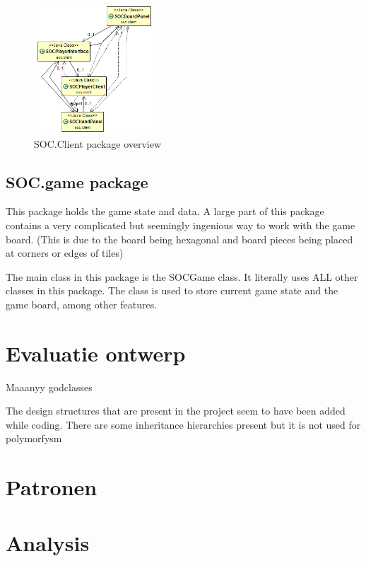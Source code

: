 \documentclass[pdftex12pt, a4paper]{article}
\begin{document}
\begin{figure}
\begin{center}
\includegraphics[width=0.4\textwidth]{Image/Ontwerp/ClientCore.png}
\caption{SOC.Client package overview}
\label{fig:empty}
\end{center}
\end{figure}

\subsection{SOC.game package}
This package holds the game state and data. 
A large part of this package contains a very complicated but seemingly ingenious way to work with the game board. 
(This is due to the board being hexagonal and board pieces being placed at corners or edges of tiles)

The main class in this package is the SOCGame class. 
It literally uses ALL other classes in this package. 
The class is used to store current game state and the game board, among other features.

\newpage

\section{Evaluatie ontwerp}

Maaanyy godclasses

The design structures that are present in the project seem to have been added while coding. 
There are some inheritance hierarchies present but it is not used for polymorfysm 

\section{Patronen}

\newpage

\section{Analysis}
\end{document}

